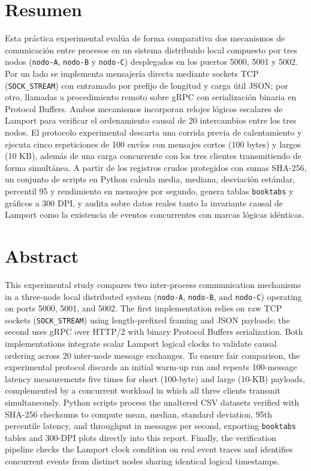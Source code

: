 \section*{Resumen}

Esta práctica experimental evalúa de forma comparativa dos mecanismos de comunicación entre procesos en un sistema distribuido local compuesto por tres nodos (\texttt{nodo-A}, \texttt{nodo-B} y \texttt{nodo-C}) desplegados en los puertos 5000, 5001 y 5002. Por un lado se implementa mensajería directa mediante sockets TCP (\texttt{SOCK\_STREAM}) con entramado por prefijo de longitud y carga útil JSON; por otro, llamadas a procedimiento remoto sobre gRPC con serialización binaria en Protocol Buffers. Ambos mecanismos incorporan relojes lógicos escalares de Lamport para verificar el ordenamiento causal de 20 intercambios entre los tres nodos. El protocolo experimental descarta una corrida previa de calentamiento y ejecuta cinco repeticiones de 100 envíos con mensajes cortos (100 bytes) y largos (10 KB), además de una carga concurrente con los tres clientes transmitiendo de forma simultánea. A partir de los registros crudos protegidos con sumas SHA-256, un conjunto de scripts en Python calcula media, mediana, desviación estándar, percentil 95 y rendimiento en mensajes por segundo, genera tablas \texttt{booktabs} y gráficos a 300 DPI, y audita sobre datos reales tanto la invariante causal de Lamport como la existencia de eventos concurrentes con marcas lógicas idénticas.

\section*{Abstract}

This experimental study compares two inter-process communication mechanisms in a three-node local distributed system (\texttt{nodo-A}, \texttt{nodo-B}, and \texttt{nodo-C}) operating on ports 5000, 5001, and 5002. The first implementation relies on raw TCP sockets (\texttt{SOCK\_STREAM}) using length-prefixed framing and JSON payloads; the second uses gRPC over HTTP/2 with binary Protocol Buffers serialization. Both implementations integrate scalar Lamport logical clocks to validate causal ordering across 20 inter-node message exchanges. To ensure fair comparison, the experimental protocol discards an initial warm-up run and repeats 100-message latency measurements five times for short (100-byte) and large (10-KB) payloads, complemented by a concurrent workload in which all three clients transmit simultaneously. Python scripts process the unaltered CSV datasets verified with SHA-256 checksums to compute mean, median, standard deviation, 95th percentile latency, and throughput in messages per second, exporting \texttt{booktabs} tables and 300-DPI plots directly into this report. Finally, the verification pipeline checks the Lamport clock condition on real event traces and identifies concurrent events from distinct nodes sharing identical logical timestamps.

